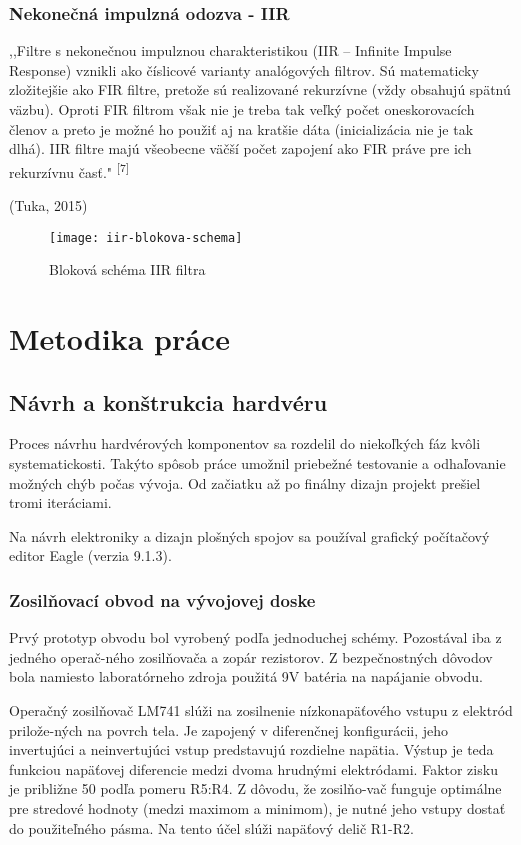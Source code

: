 \documentclass[titlepage,12pt]{article}
\begin{document}
\subsubsection*{Nekonečná impulzná odozva - IIR}
,,Filtre s nekonečnou impulznou charakteristikou (IIR – Infinite Impulse Response) vznikli ako číslicové varianty analógových filtrov. Sú matematicky zložitejšie ako FIR filtre, pretože  sú  realizované rekurzívne  (vždy  obsahujú  spätnú  väzbu).  Oproti  FIR filtrom však nie je treba tak veľký počet oneskorovacích členov a preto je možné ho použiť aj na kratšie dáta (inicializácia nie je tak dlhá). IIR filtre majú všeobecne väčší počet zapojení ako FIR práve pre ich rekurzívnu časť." \textsuperscript{[7]}
\begin{flushright}
(Tuka, 2015)
\end{flushright}
\begin{figure}[!ht]
\begin{center}
\texttt{[image: iir-blokova-schema]}
\caption{Bloková schéma IIR filtra}
\end{center}
\end{figure}


\newpage
\section{Metodika práce}
\subsection{Návrh a konštrukcia hardvéru}
Proces návrhu hardvérových komponentov sa rozdelil do niekoľkých fáz kvôli \mbox{systematickosti}. Takýto spôsob práce umožnil priebežné testovanie a odhaľovanie možných chýb počas vývoja. Od začiatku až po finálny dizajn projekt prešiel tromi iteráciami. 

Na návrh elektroniky a dizajn plošných spojov sa používal grafický počítačový editor \linebreak Eagle (verzia 9.1.3).

\subsubsection{Zosilňovací obvod na vývojovej doske}
Prvý prototyp obvodu bol vyrobený podľa jednoduchej schémy. Pozostával iba z jedného operač-ného zosilňovača a zopár rezistorov. Z bezpečnostných dôvodov bola namiesto laboratórneho zdroja použitá 9V batéria na napájanie obvodu. 

Operačný zosilňovač LM741 slúži na zosilnenie nízkonapäťového vstupu z elektród prilože-ných na povrch tela. Je zapojený v diferenčnej konfigurácii, jeho invertujúci a neinvertujúci vstup predstavujú rozdielne napätia. Výstup je teda funkciou napäťovej diferencie medzi dvoma hrudnými elektródami. Faktor zisku je približne 50 podľa pomeru R5:R4. Z dôvodu, že zosilňo-vač funguje optimálne pre stredové hodnoty (medzi maximom a minimom), je nutné jeho vstupy dostať do použiteľného pásma. Na tento účel slúži napäťový delič R1-R2.
\end{document}
